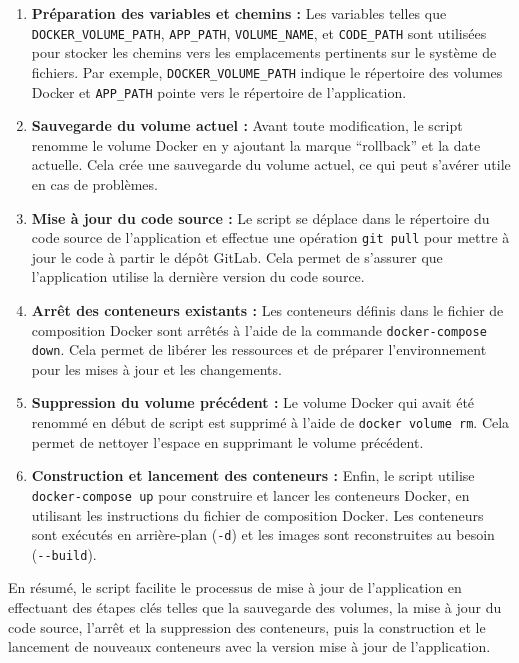 \begin{enumerate}
    \item \textbf{Préparation des variables et chemins :} Les variables telles que \Verb|DOCKER_VOLUME_PATH|, \Verb|APP_PATH|, \Verb|VOLUME_NAME|, et \Verb|CODE_PATH| sont utilisées pour stocker les chemins vers les emplacements pertinents sur le système de fichiers. Par exemple, \Verb|DOCKER_VOLUME_PATH| indique le répertoire des volumes Docker et \Verb|APP_PATH| pointe vers le répertoire de l'application.
    \item \textbf{Sauvegarde du volume actuel :} Avant toute modification, le script renomme le volume Docker en y ajoutant la marque \foreignquote{french}{rollback} et la date actuelle. Cela crée une sauvegarde du volume actuel, ce qui peut s'avérer utile en cas de problèmes.
    \item \textbf{Mise à jour du code source :} Le script se déplace dans le répertoire du code source de l'application et effectue une opération \Verb|git pull| pour mettre à jour le code à partir le dépôt GitLab. Cela permet de s'assurer que l'application utilise la dernière version du code source.
    \item \textbf{Arrêt des conteneurs existants :} Les conteneurs définis dans le fichier de composition Docker sont arrêtés à l'aide de la commande \Verb|docker-compose| \Verb|down|. Cela permet de libérer les ressources et de préparer l'environnement pour les mises à jour et les changements.
    \item \textbf{Suppression du volume précédent :} Le volume Docker qui avait été renommé en début de script est supprimé à l'aide de \Verb|docker volume rm|. Cela permet de nettoyer l'espace en supprimant le volume précédent.
    \item \textbf{Construction et lancement des conteneurs :} Enfin, le script utilise \Verb|docker-compose up| pour construire et lancer les conteneurs Docker, en utilisant les instructions du fichier de composition Docker. Les conteneurs sont exécutés en arrière-plan (\Verb|-d|) et les images sont reconstruites au besoin (\Verb|--build|).
\end{enumerate}

En résumé, le script facilite le processus de mise à jour de l'application en effectuant des étapes clés telles que la sauvegarde des volumes, la mise à jour du code source, l'arrêt et la suppression des conteneurs, puis la construction et le lancement de nouveaux conteneurs avec la version mise à jour de l'application.

